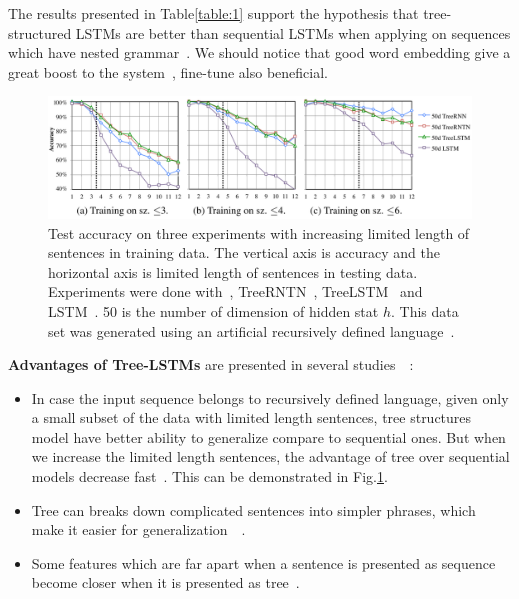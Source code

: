 The results presented in Table\ref{table:1} support the hypothesis that tree-structured LSTMs are better than sequential LSTMs when applying on sequences which have nested grammar~\cite{treeVSseq}. 
We should notice that good word embedding give a great boost to the system~\cite{Luong_betterword}, fine-tune also beneficial.

\begin{figure}[H]
    \centering
    \includegraphics[scale=0.38]{figure/tree-vs-seq}
    \caption[Test accuracy vs sentence length]{Test accuracy on three experiments with increasing limited length of sentences in training data. 
The vertical axis is accuracy and the horizontal axis is limited length of sentences in testing data. 
Experiments were done with~\cite{socher2013recursive}, TreeRNTN~\cite{socher2013recursive}, TreeLSTM~\cite{treeLSTM} and LSTM~\cite{originLSTM}. 
50 is the number of dimension of hidden stat \(h\). 
This data set was generated using an artificial recursively defined language~\cite{bowman-treevslstm}.} 
    \label{fig:tree-vs-seq}
\end{figure}
\label{sec:tree-discuss}
\textbf{Advantages of Tree-LSTMs} are presented in several studies~\cite{need-tree}~\cite{bowman-treevslstm}: \label{treelstm-advantage}
\begin{itemize}
\item In case the input sequence belongs to recursively defined language, given only a small subset of the data with limited length sentences, tree structures model have better ability to generalize compare to sequential ones.
But when we increase the limited length sentences, the advantage of tree over sequential models decrease fast~\cite{bowman-treevslstm}. 
This can be demonstrated in Fig.\ref{fig:tree-vs-seq}.
\item Tree can breaks down complicated sentences into simpler phrases, which make it easier for generalization~\cite{knowledge-matter}~\cite{need-tree}.
\item Some features which are far apart when a sentence is presented as sequence become closer when it is presented as tree~\cite{need-tree}.
\end{itemize}


